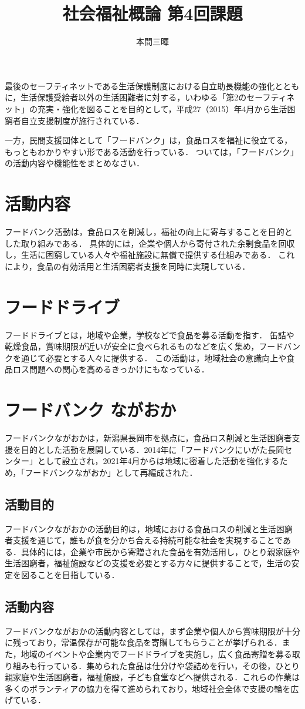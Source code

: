 \documentclass[titlepage,a4paper]{jsarticle}
\title{社会福祉概論 第4回課題}
\author{本間三暉}
\begin{document}
\maketitle
最後のセーフティネットである生活保護制度における自立助長機能の強化とともに，生活保護受給者以外の生活困難者に対する，いわゆる「第2のセーフティネット」の充実・強化を図ることを目的として，平成27（2015）年4月から生活困窮者自立支援制度が施行されている．

一方，民間支援団体として「フードバンク」は，食品ロスを福祉に役立てる，もっともわかりやすい形である活動を行っている．
ついては，「フードバンク」の活動内容や機能性をまとめなさい．
\section{活動内容}
フードバンク活動は，食品ロスを削減し，福祉の向上に寄与することを目的とした取り組みである．
具体的には，企業や個人から寄付された余剰食品を回収し，生活に困窮している人々や福祉施設に無償で提供する仕組みである．
これにより，食品の有効活用と生活困窮者支援を同時に実現している．

\section{フードドライブ}
フードドライブとは，地域や企業，学校などで食品を募る活動を指す．
缶詰や乾燥食品，賞味期限が近いが安全に食べられるものなどを広く集め，フードバンクを通じて必要とする人々に提供する．
この活動は，地域社会の意識向上や食品ロス問題への関心を高めるきっかけにもなっている．

\section{フードバンク ながおか}
フードバンクながおかは，新潟県長岡市を拠点に，食品ロス削減と生活困窮者支援を目的とした活動を展開している．2014年に「フードバンクにいがた長岡センター」として設立され，2021年4月からは地域に密着した活動を強化するため，「フードバンクながおか」として再編成された．
\subsection{活動目的}
フードバンクながおかの活動目的は，地域における食品ロスの削減と生活困窮者支援を通じて，誰もが食を分かち合える持続可能な社会を実現することである．具体的には，企業や市民から寄贈された食品を有効活用し，ひとり親家庭や生活困窮者，福祉施設などの支援を必要とする方々に提供することで，生活の安定を図ることを目指している．
\subsection{活動内容}
フードバンクながおかの活動内容としては，まず企業や個人から賞味期限が十分に残っており，常温保存が可能な食品を寄贈してもらうことが挙げられる．また，地域のイベントや企業内でフードドライブを実施し，広く食品寄贈を募る取り組みも行っている．集められた食品は仕分けや袋詰めを行い，その後，ひとり親家庭や生活困窮者，福祉施設，子ども食堂などへ提供される．これらの作業は多くのボランティアの協力を得て進められており，地域社会全体で支援の輪を広げている．
\end{document}
